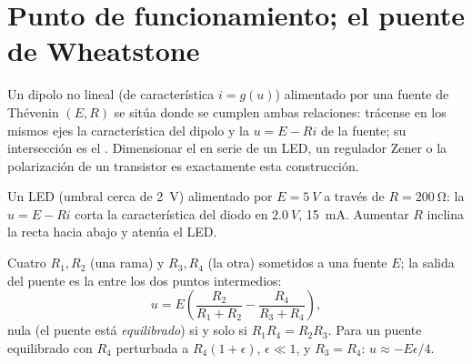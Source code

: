 \section{Punto de funcionamiento; el puente de Wheatstone}

\begin{method}\label{met:b1:dc-circuits:loadline}
Un dipolo no lineal (de característica $i = g(u)$) alimentado por una
fuente de Thévenin $(E, R)$ se sitúa donde se cumplen ambas relaciones:
trácense en los mismos ejes la característica del dipolo y la \emph{} $u = E - Ri$ de la fuente; su intersección es el \emph{}. Dimensionar el  en serie de un LED, un regulador
Zener o la polarización de un transistor es exactamente esta construcción.
\end{method}

\begin{omfigure}

{\small Un LED (umbral cerca de \qty{2}{V}) alimentado por $E = \qty{5}{V}$
a través de $R = \qty{200}{\ohm}$: la  $u = E - Ri$ corta la
característica del diodo en $\qty{2.0}{V}$, \qty{15}{mA}. Aumentar $R$
inclina la recta hacia abajo y atenúa el LED.}
\end{omfigure}

\begin{proposition}\label{prop:b1:dc-circuits:wheatstone}
Cuatro  $R_1, R_2$ (una rama) y $R_3, R_4$ (la otra) sometidos a
una fuente $E$; la salida del puente es la  entre los dos puntos
intermedios:
\[
u = E\left(\frac{R_2}{R_1 + R_2} - \frac{R_4}{R_3 + R_4}\right),
\]
nula (el puente está \emph{equilibrado}) si y solo si $R_1R_4 = R_2R_3$.
Para un puente equilibrado con $R_4$ perturbada a $R_4(1 + \epsilon)$, $\epsilon
\ll 1$, y $R_3 = R_4$: $u \approx -E\epsilon/4$.
\end{proposition}

